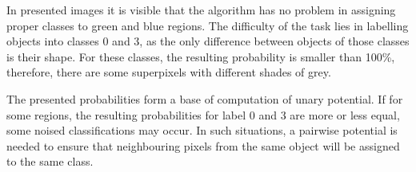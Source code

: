 In presented images it is visible that the algorithm has no problem in assigning proper classes to green and blue regions. The difficulty of the task lies in labelling objects into classes 0 and 3, as the only difference between objects of those classes is their shape. For these classes, the resulting probability is smaller than 100\%, therefore, there are some superpixels with different shades of grey. 

The presented probabilities form a base of computation of unary potential. If for some regions, the resulting probabilities for label 0 and 3 are more or less equal, some noised classifications may occur. In such situations, a pairwise potential is needed to ensure that neighbouring pixels from the same object will be assigned to the same class.